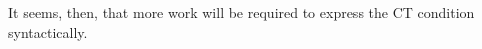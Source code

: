 \documentclass[
]{RCL}
\begin{document}
It seems, then, that more work will be required to express the CT condition syntactically.


%
%
\end{document}
